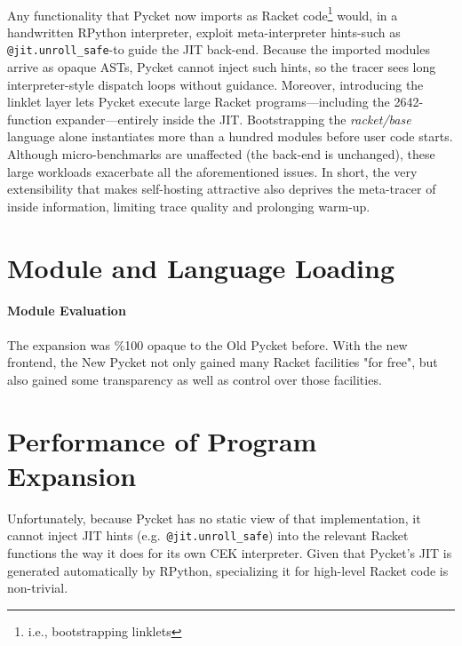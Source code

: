 	\paragraph{}%
		Any functionality that Pycket now imports as Racket code\footnote{i.e., bootstrapping linklets} would, in a handwritten RPython interpreter, exploit meta-interpreter hints-such as \verb|@jit.unroll_safe|-to guide the JIT back-end. Because the imported modules arrive as opaque ASTs, Pycket cannot inject such hints, so the tracer sees long interpreter-style dispatch loops without guidance. Moreover, introducing the linklet layer lets Pycket execute large Racket programs—including the 2642-function expander—entirely inside the JIT. Bootstrapping the \emph{racket/base} language alone instantiates more than a hundred modules before user code starts. Although micro-benchmarks are unaffected (the back-end is unchanged), these large workloads exacerbate all the aforementioned issues. In short, the very extensibility that makes self-hosting attractive also deprives the meta-tracer of inside information, limiting trace quality and prolonging warm-up.

	\section{Module and Language Loading}
	\label{section:module-and-language-loading}

		\paragraph{Module Evaluation}%
		The expansion was \%100 opaque to the Old Pycket before. With the new frontend, the New Pycket not only gained many Racket facilities "for free", but also gained some transparency as well as control over those facilities.

	\section{Performance of Program Expansion}
	\label{section:expander-performance}



		 Unfortunately, because Pycket has no static view of that implementation, it cannot inject JIT hints (e.g.\ \verb|@jit.unroll_safe|) into the relevant Racket functions the way it does for its own CEK interpreter.  Given that Pycket’s JIT is generated automatically by RPython, specializing it for high-level Racket code is non-trivial.


